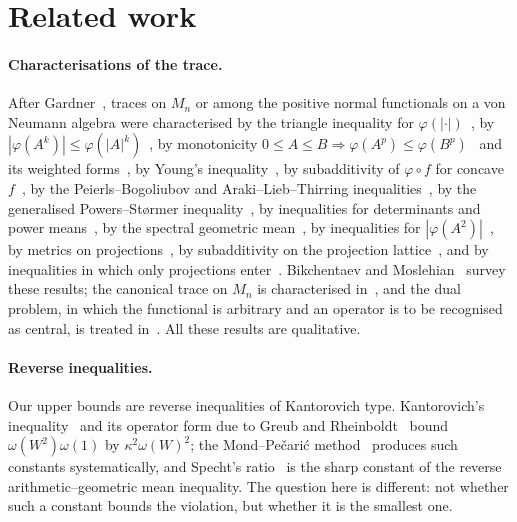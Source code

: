 \documentclass[11pt]{article}
\theoremstyle{plain}
\theoremstyle{definition}
\theoremstyle{remark}
\begin{document}
\section{Related work}\label{sec:related}

\paragraph{Characterisations of the trace.} After Gardner~\cite{gardner1979}, traces on $M_n$ or among the positive
normal functionals on a von Neumann algebra were characterised by the triangle inequality for
$\varphi(|\cdot|)$~\cite{gardner1979,stolyarov2002}, by $|\varphi(A^k)|\le\varphi(|A|^k)$~\cite{petz1988}, by
monotonicity $0\le A\le B\Rightarrow\varphi(A^p)\le\varphi(B^p)$~\cite{bikchentaev2007mono,sano2006} and its weighted
forms~\cite{hoa2007,hoa2010}, by Young's inequality~\cite{bikchentaev2005young,cho2009}, by subadditivity of
$\varphi\circ f$ for concave $f$~\cite{tikhonov2005}, by the Peierls--Bogoliubov and Araki--Lieb--Thirring
inequalities~\cite{bikchentaev2011pb}, by the generalised Powers--St{\o}rmer inequality~\cite{hoa2013}, by inequalities
for determinants and power means~\cite{bikchentaev2020det}, by the spectral geometric mean~\cite{bikchentaev2026sgm}, by
inequalities for $|\varphi(A^2)|$~\cite{bikchentaev2026moslehian}, by metrics on projections~\cite{bikchentaev2019metric},
by subadditivity on the projection lattice~\cite[Theorem~4]{petz1988}, and by inequalities in which only projections
enter~\cite{bikchentaev2009rm,bikchentaev2010smj,bikchentaev2011mn,bikchentaev2019abed}. Bikchentaev and
Moslehian~\cite{bikchentaev2025survey} survey these results; the canonical trace on $M_n$ is characterised
in~\cite{moslehian2025jmaa,bikchentaev2020det}, and the dual problem, in which the functional is arbitrary and an
operator is to be recognised as central, is treated in~\cite{novikov2015}. All these results are qualitative.

\paragraph{Reverse inequalities.} Our upper bounds are reverse inequalities of Kantorovich type. Kantorovich's
inequality~\cite{kantorovich1948} and its operator form due to Greub and Rheinboldt~\cite{greub1959} bound
$\omega(W^2)\omega(1)$ by $\kappa^2\omega(W)^2$; the Mond--Pe\v{c}ari\'c method~\cite{furuta2005} produces such constants
systematically, and Specht's ratio~\cite{specht1960} is the sharp constant of the reverse arithmetic--geometric mean
inequality. The question here is different: not whether such a constant bounds the violation, but whether it is the
smallest one.
\end{document}

